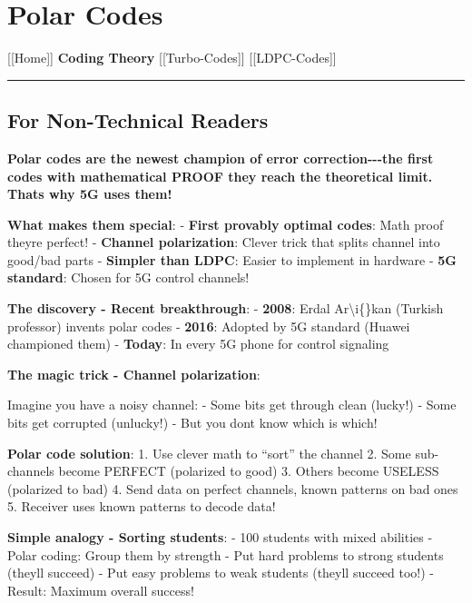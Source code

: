 \section{Polar Codes}\label{polar-codes}

{[}{[}Home{]}{]} \textbar{} \textbf{Coding Theory} \textbar{}
{[}{[}Turbo-Codes{]}{]} \textbar{} {[}{[}LDPC-Codes{]}{]}

\begin{center}\rule{0.5\linewidth}{0.5pt}\end{center}

\subsection{\texorpdfstring{ For Non-Technical
Readers}{ For Non-Technical Readers}}\label{for-non-technical-readers}

\textbf{Polar codes are the newest champion of error
correction-\/-\/-the first codes with mathematical PROOF they reach the
theoretical limit. That\textquotesingle s why 5G uses them!}

\textbf{What makes them special}: - \textbf{First provably optimal
codes}: Math proof they\textquotesingle re perfect! - \textbf{Channel
polarization}: Clever trick that splits channel into good/bad parts -
\textbf{Simpler than LDPC}: Easier to implement in hardware - \textbf{5G
standard}: Chosen for 5G control channels!

\textbf{The discovery - Recent breakthrough}: - \textbf{2008}: Erdal
Ar\textbackslash i\{\}kan (Turkish professor) invents polar codes -
\textbf{2016}: Adopted by 5G standard (Huawei championed them) -
\textbf{Today}: In every 5G phone for control signaling

\textbf{The magic trick - Channel polarization}:

Imagine you have a noisy channel: - Some bits get through clean (lucky!)
- Some bits get corrupted (unlucky!) - But you don\textquotesingle t
know which is which!

\textbf{Polar code solution}: 1. Use clever math to ``sort'' the channel
2. Some sub-channels become PERFECT (polarized to good) 3. Others become
USELESS (polarized to bad) 4. Send data on perfect channels, known
patterns on bad ones 5. Receiver uses known patterns to decode data!

\textbf{Simple analogy - Sorting students}: - 100 students with mixed
abilities - Polar coding: Group them by strength - Put hard problems to
strong students (they\textquotesingle ll succeed) - Put easy problems to
weak students (they\textquotesingle ll succeed too!) - Result: Maximum
overall success!

